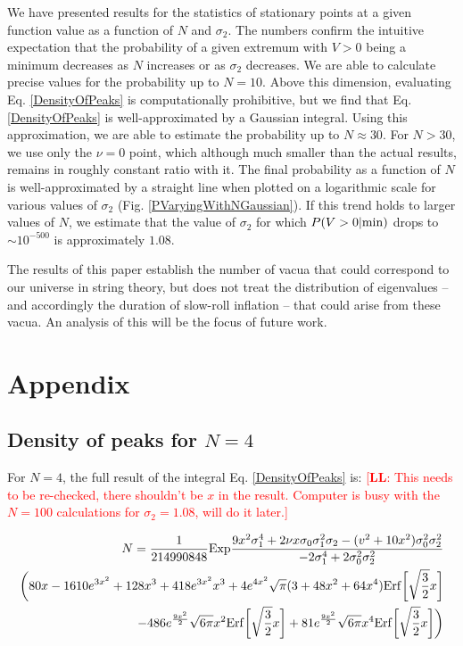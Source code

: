 \documentclass[12pt]{article}
\newcommand{\lfl}[1]{\textcolor{red}{[{\bf LL}: #1]}}
\begin{document}
We have presented results for the statistics of stationary points at a given function value as a function of $N$ and $\sigma_2$. The numbers confirm the intuitive expectation that the probability of a given extremum with $V > 0$ being a minimum decreases as $N$ increases or as $\sigma_2$ decreases. We are able to calculate precise values for the probability up to $N=10$. Above this dimension, evaluating Eq. \ref{DensityOfPeaks} is computationally prohibitive, but we find that Eq. \ref{DensityOfPeaks} is well-approximated by a Gaussian integral. Using this approximation, we are able to estimate the probability up to $N \approx 30$. For $N>30$, we use only the $\nu=0$ point, which although much smaller than the actual results, remains in roughly constant ratio with it. The final probability as a function of $N$ is well-approximated by a straight line when plotted on a logarithmic scale for various values of $\sigma_2$ (Fig. \ref{PVaryingWithNGaussian}). If this trend holds to larger values of $N$, we estimate that the value of $\sigma_2$ for which $P(V>0|{\rm min})$ drops to $\sim 10^{-500}$ is approximately $1.08$.

The results of this paper establish the number of vacua that could correspond to our universe in string theory, but does not treat the distribution of eigenvalues -- and accordingly the duration of slow-roll inflation -- that could arise from these vacua. An analysis of this will be the focus of future work.

\section{Appendix}
\subsection{Density of peaks for $N=4$} 
For $N=4$, the full result of the integral Eq. \ref{DensityOfPeaks} is: \lfl{This needs to be re-checked, there shouldn't be $x$ in the result. Computer is busy with the $N=100$ calculations for $\sigma_2=1.08$, will do it later.}

\begin{equation}
\begin{split}
N = \frac{1}{214990848} \mathrm{Exp}\frac{9x^2\sigma_1^4 + 2\nu x \sigma_0 \sigma_1^2 \sigma_2 - (v^2+10x^2)\sigma_0^2\sigma_2^2}{-2\sigma_1^4+2\sigma_0^2\sigma_2^2}\\\bigg{(}80x - 1610e^{3x^2}+128x^3+418e^{3x^2}x^3+4e^{4x^2}\sqrt{\pi}(3+48x^2+64x^4)\mathrm{Erf}\bigg{[}\sqrt{\frac{3}{2}}x\bigg{]}\\
-486e^{\frac{9x^2}{2}}\sqrt{6\pi}x^2\mathrm{Erf}\bigg{[}\sqrt{\frac{3}{2}}x\bigg{]}+81e^{\frac{9x^2}{2}}\sqrt{6\pi}x^4\mathrm{Erf}\bigg{[}\sqrt{\frac{3}{2}}x\bigg{]}\bigg{)}
\end{split}
\end{equation}
\end{document}
